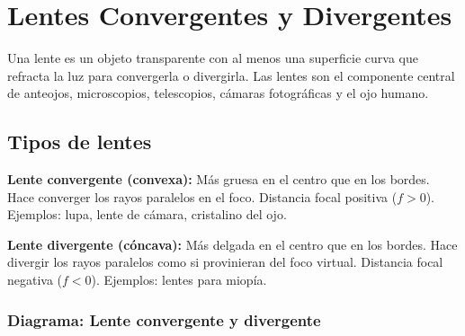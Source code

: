 
\section{Lentes Convergentes y Divergentes}

\begin{seccion}
Una lente es un objeto transparente con al menos una superficie curva que refracta la luz para convergerla o divergirla. Las lentes son el componente central de anteojos, microscopios, telescopios, cámaras fotográficas y el ojo humano.
\end{seccion}

\subsection{Tipos de lentes}

\begin{seccion}
\begin{definicion}
\textbf{Lente convergente (convexa):} Más gruesa en el centro que en los bordes. Hace converger los rayos paralelos en el foco. Distancia focal positiva ($f > 0$). Ejemplos: lupa, lente de cámara, cristalino del ojo.
\end{definicion}

\begin{definicion}
\textbf{Lente divergente (cóncava):} Más delgada en el centro que en los bordes. Hace divergir los rayos paralelos como si provinieran del foco virtual. Distancia focal negativa ($f < 0$). Ejemplos: lentes para miopía.
\end{definicion}
\end{seccion}

\subsubsection{Diagrama: Lente convergente y divergente}

